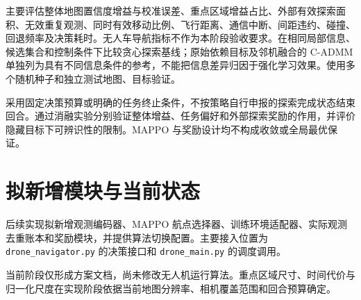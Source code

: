 \documentclass[UTF8,a4paper,11pt,fontset=fandol]{ctexart}
\begin{document}
主要评估整体地图置信度增益与校准误差、重点区域增益占比、外部有效探索面积、无效重复观测、同时有效移动比例、飞行距离、通信中断、间距违约、碰撞、回退频率及决策耗时。无人车导航指标不作为本阶段验收要求。在相同局部信息、候选集合和控制条件下比较贪心探索基线；原始依赖目标及邻机融合的 C-ADMM 单独列为具有不同信息条件的参考，不能把信息差异归因于强化学习效果。使用多个随机种子和独立测试地图、目标验证。

采用固定决策预算或明确的任务终止条件，不按策略自行申报的探索完成状态结束回合。通过消融实验分别验证整体增益、任务偏好和外部探索奖励的作用，并评价隐藏目标下可辨识性的限制。MAPPO 与奖励设计均不构成收敛或全局最优保证。

\section{拟新增模块与当前状态}
后续实现拟新增观测编码器、MAPPO 航点选择器、训练环境适配器、实际观测去重账本和奖励模块，并提供算法切换配置。主要接入位置为 \texttt{drone\_navigator.py} 的决策接口和 \texttt{drone\_main.py} 的调度调用。

当前阶段仅形成方案文档，尚未修改无人机运行算法。重点区域尺寸、时间代价与归一化尺度在实现阶段依据当前地图分辨率、相机覆盖范围和回合预算确定。
\end{document}

